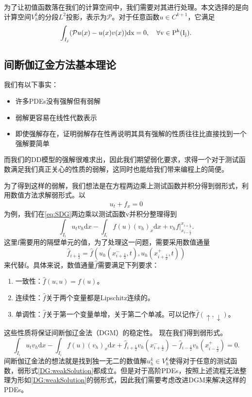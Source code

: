 为了让初值函数落在我们的计算空间中，我们需要对其进行处理。本文选择的是向计算空间$V_h^k$的分段$L^2$投影，表示为$\mathcal{P}$。对于任意函数$u\in C^{k+1}$，它满足
\begin{align}
    \int_{I_j}(\mathcal{P}u(x)-u(x)v(x)) \rm{d}x = 0, \quad \forall v \in P^k(I_j).
\end{align}
\subsection{间断伽辽金方法基本理论}

我们有以下事实\cite{sullivan2020brief}：
\begin{itemize}
    \item 许多PDEs没有强解但有弱解
    \item 弱解更容易在线性代数表示
    \item 即使强解存在，证明弱解存在性再说明其具有强解的性质往往比直接找到一个强解要简单
\end{itemize}
而我们的DD模型的强解很难求出，因此我们期望弱化要求，求得一个对于测试函数满足我们真正关心的性质的弱解，这同时也能给我们带来编程上的简便。

为了得到这样的弱解，我们想法是在方程两边乘上测试函数并积分得到弱形式，利用数值方法求解弱形式。以
\begin{align}
    u_t + f_x = 0\label{eq:SDG}
\end{align}
为例，我们在\eqref{eq:SDG}两边乘以测试函数v并积分整理得到
\begin{equation}
    \int_{I_i}u_t v_h\mathrm{d}x - \int_{I_i}f(u)(v_h)_x\mathrm{d}x+v_hf\bigg|^{x_{i+\frac{1}{2}}}_{x_{i-\frac{1}{2}}}.
\end{equation}
这里f需要用的隔壁单元的值，为了处理这一问题，需要采用数值通量
\begin{equation*}
    \hat{f}_{i+\frac{1}{2}}=\hat{f}(u_h(x^-_{i+\frac{1}{2}},t),u_h(x^+_{i+\frac{1}{2}},t))
\end{equation*}
来代替f。具体来说，数值通量$\hat{f}$需要满足下列要求：
\begin{enumerate}
    \item 一致性：$\hat{f}(u,u)=f(u)$。
    \item 连续性：$\hat{f}$关于两个变量都是Lipschitz连续的。
    \item 单调性：$\hat{f}$关于第一个变量单增，关于第二个单减。可以记作$\hat{f}(\uparrow,\downarrow)$。
\end{enumerate}
这些性质将保证间断伽辽金法（DGM）的稳定性。
现在我们得到弱形式。
\begin{equation}
    \int_{I_i}u_t v_h\mathrm{d}x - \int_{I_i}f(u)(v_h)_x\mathrm{d}x+\hat{f}_{i+\frac{1}{2}}v_h(x^-_{i+\frac{1}{2}})-\hat{f}_{i-\frac{1}{2}}v_h(x^+_{i-\frac{1}{2}}) = 0. \label{DG:weakSolution}
\end{equation}
间断伽辽金法的想法就是找到独一无二的数值解$u_h^k\in V_h^k$使得对于任意的测试函数，弱形式\eqref{DG:weakSolution}都成立。但是对于高阶PDEs，按照上述流程无法整理为形如\eqref{DG:weakSolution}的弱形式，因此我们需要考虑改进DGM来解决这样的PDEs。

